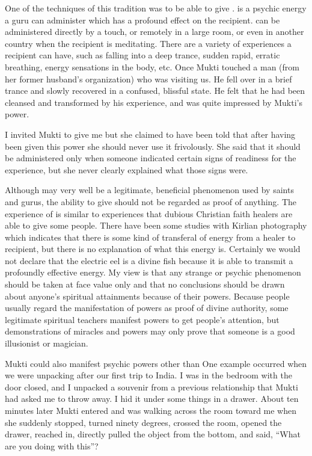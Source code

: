 \documentclass[a5paper,10pt,english]{book}
\begin{document}
\sphinxAtStartPar
One of the techniques of this tradition was to be able to give
.  is a psychic energy a guru can administer which
has a profound effect on the recipient.  can be
administered directly by a touch, or remotely in a large room, or even
in another country when the recipient is meditating. There are a variety
of experiences a recipient can have, such as falling into a deep trance,
sudden rapid, erratic breathing, energy sensations in the body, etc.
Once Mukti touched a man (from her former husband’s organization) who
was visiting us. He fell over in a brief trance and slowly recovered in
a confused, blissful state. He felt that he had been cleansed and
transformed by his experience, and was quite impressed by Mukti’s power.

\sphinxAtStartPar
I invited Mukti to give me  but she claimed to have been
told that after having been given this power she should never use it
frivolously. She said that it should be administered only when someone
indicated certain signs of readiness for the experience, but she never
clearly explained what those signs were.

\sphinxAtStartPar
Although  may very well be a legitimate, beneficial
phenomenon used by saints and gurus, the ability to give 
should not be regarded as proof of anything. The experience of
 is similar to experiences that dubious Christian faith
healers are able to give some people. There have been some studies with
Kirlian photography which indicates that there is some kind of
transferal of energy from a healer to recipient, but there is no
explanation of what this energy is. Certainly we would not declare that
the electric eel is a divine fish because it is able to transmit a
profoundly effective energy. My view is that any strange or psychic
phenomenon should be taken at face value only and that no conclusions
should be drawn about anyone’s spiritual attainments because of their
powers. Because people usually regard the manifestation of powers as
proof of divine authority, some legitimate spiritual teachers manifest
powers to get people’s attention, but demonstrations of miracles and
powers may only prove that someone is a good illusionist or magician.

\sphinxAtStartPar
Mukti could also manifest psychic powers other than  One
example occurred when we were unpacking after our first trip to India. I
was in the bedroom with the door closed, and I unpacked a souvenir from
a previous relationship that Mukti had asked me to throw away. I hid it
under some things in a drawer. About ten minutes later Mukti entered and
was walking across the room toward me when she suddenly stopped, turned
ninety degrees, crossed the room, opened the drawer, reached in,
directly pulled the object from the bottom, and said, “What are you
doing with this”?
\end{document}
